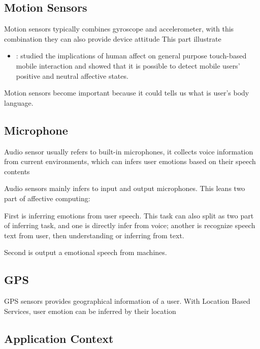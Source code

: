 \subsection{Motion Sensors}\label{subsec:motion}
Motion sensors typically combines gyroscope and accelerometer, with this combination they can also provide device attitude
This part illustrate \cite{Rana, Mottelson2016, Bailenson2007}


\begin{itemize}
    \item \cite{Mottelson2016}: studied the implications of
    human affect on general purpose touch-based mobile interaction and showed that it is possible to detect mobile users’ positive and neutral affective states.
\end{itemize}

Motion sensors become important because it could tells us what is user's body language.

\subsection{Microphone}\label{subsec:audio}
Audio sensor usually refers to built-in microphones, it collects voice information from current environments, which can infers user emotions based on their speech contents

Audio sensors mainly infers to input and output microphones. This leans two part of affective computing:

First is inferring emotions from user speech. 
This task can also split as two part of inferring task, and one is directly infer from voice;
another is recognize speech text from user, then understanding or inferring from text.

Second is output a emotional speech from machines.

\subsection{GPS}\label{subsec:gps}
GPS sensors provides geographical information of a user. With Location Based Services, user emotion can be inferred by their location

\subsection{Application Context}\label{subsec:ui}